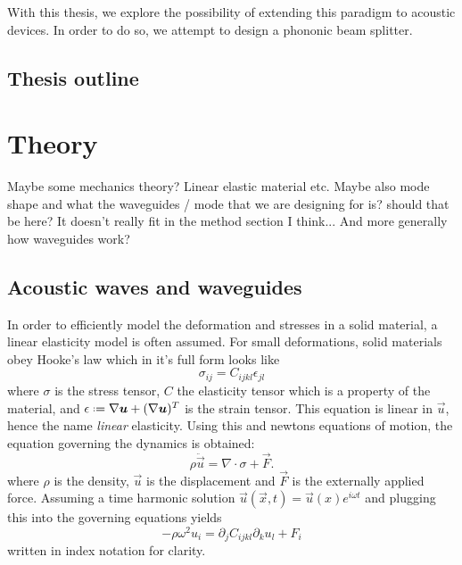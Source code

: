 \documentclass[11pt]{article}
\begin{document}
With this thesis, we explore the possibility of extending this paradigm to
acoustic devices. In order to do so, we attempt to design a phononic beam
splitter.

\subsection{Thesis outline}

\section{Theory}

Maybe some mechanics theory? Linear elastic material etc.
Maybe also mode shape and what the waveguides / mode that we are designing for
is? should that be here? It doesn't really fit in the method section I think...
And more generally how waveguides work?

\subsection{Acoustic waves and waveguides}

In order to efficiently model the deformation and stresses in a solid material,
a linear elasticity model is often assumed.
For small deformations, solid materials obey Hooke's law which in it's full form
looks like
\[
	\sigma_{ij} = C_{ijkl} \epsilon_{jl}
\]
where $\sigma$ is the stress tensor, $C$ the elasticity tensor which is a
property of the material, and 
$\epsilon \defeq \nabla \vec u + (\nabla \vec u)^T$
is the strain tensor.
This equation is linear in $\vec u$, hence the name \emph{linear} elasticity.
Using this and newtons equations of motion, the equation governing the dynamics
is obtained:
\[
	\rho \ddot{\vec{u}} = \nabla \cdot \sigma + \vec F.
\]
where $\rho$ is the density, $\vec{u}$ is the displacement and $\vec F$ is the
externally applied force.
Assuming a time harmonic solution
$\vec u(\vec x, t) = \vec u(x) e^{i \omega t}$ and plugging this into
the governing equations yields
\begin{equation}\label{eq:gov_eq}
	-\rho \omega^2 u_i = \partial_j C_{ijkl} \partial_k u_l + F_i
\end{equation}
written in index notation for clarity. 
\end{document}
